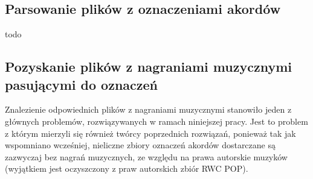 \subsection{Parsowanie plików z oznaczeniami akordów}
todo




\subsection{Pozyskanie plików z nagraniami muzycznymi pasującymi do oznaczeń}

Znalezienie odpowiednich plików z nagraniami muzycznymi stanowiło jeden z głównych problemów,
rozwiązywanych w ramach niniejszej pracy. Jest to problem z którym mierzyli się również twórcy
poprzednich rozwiązań, ponieważ tak jak wspomniano wcześniej, nieliczne zbiory oznaczeń
akordów dostarczane są zazwyczaj bez nagrań muzycznych, ze względu na prawa autorskie muzyków
(wyjątkiem jest oczyszczony z praw autorskich zbiór RWC POP).

